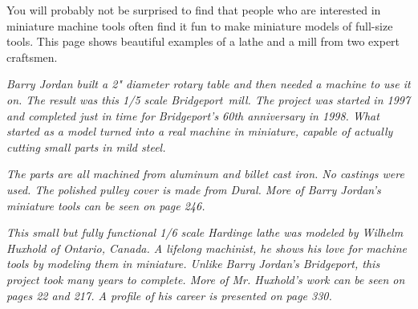 \secdown
{}\secdown

You will probably not be surprised to find that people who are interested in
miniature machine tools often find it fun to make miniature models of full-size
tools. This page shows beautiful examples of a lathe and a mill from two expert
craftsmen.

\bigskip
\textit{Barry Jordan built a 2" diameter rotary table and then needed a machine
to use it on. The result was this 1/5 scale Bridgeport\registered\ mill. The
project was started in 1997 and completed just in time for Bridgeport's 60th
anniversary in 1998. What started as a model turned into a real machine in
miniature, capable of actually cutting small parts in mild steel.}

\bigskip
\textit{The parts are all machined from aluminum and billet cast iron. No 
castings were used. The polished pulley cover is made from Dural. More of Barry 
Jordan's miniature tools can be seen on page 246.}

\bigskip
\textit{This small but fully functional 1/6 scale Hardinge lathe was modeled by 
Wilhelm Huxhold of Ontario, Canada. A lifelong machinist, he shows his love for 
machine tools by modeling them in miniature. Unlike Barry Jordan's Bridgeport, 
this project took many years to complete. More of Mr. Huxhold's work can be seen 
on pages 22 and 217. A profile of his career is presented on page 330.}

\secup
\secup
